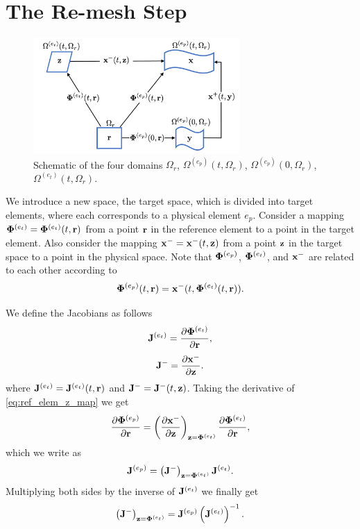 \documentclass[11pt]{report}
\begin{document}
\chapter{The Re-mesh Step}
\begin{figure}[ht]
    \centering
    \includegraphics[width=0.7\textwidth]{../../images/four_spaces.pdf}
    \caption{Schematic of the four domains $\Omega_r$, $\Omega^{(e_p)}(t,\Omega_r)$, $\Omega^{(e_p)}(0,\Omega_r)$, $\Omega^{(e_t)}(t,\Omega_r)$.}
    \label{fig:four_spaces}
 \end{figure}
We introduce a new space, the target space, which is divided into target elements, where each corresponds to a physical element $e_p$. Consider a mapping $\bm \Phi^{(e_t)}=\bm \Phi^{(e_t)}(t,\mathbf{r})$ from a point $\mathbf{r}$ in the reference element to a point in the target element. Also consider the mapping $\mathbf{x}^- = \mathbf{x}^-(t,\mathbf{z})$ from a point $\mathbf{z}$ in the target space to a point in the physical space. Note that $\bm \Phi^{(e_p)}$, $\bm \Phi^{(e_t)}$, and $\mathbf{x}^-$ are related to each other according to
\begin{equation}
    \label{eq:ref_elem_z_map}
    \bm \Phi^{(e_p)}(t,\mathbf{r}) = \mathbf{x}^-(t,\bm \Phi^{(e_t)}(t,\mathbf{r})).
\end{equation}

We define the Jacobians as follows
\begin{equation}
    \mathbf{J}^{(e_t)} = \frac{\partial \bm \Phi^{(e_t)}}{\partial \mathbf{r}},
\end{equation}
\begin{equation}
    \mathbf{J}^- = \frac{\partial \mathbf{x}^-}{\partial \mathbf{z}}.
\end{equation}
where $\mathbf{J}^{(e_t)} = \mathbf{J}^{(e_t)}(t,\mathbf{r})$ and $\mathbf{J}^-=\mathbf{J}^-(t,\mathbf{z})$. Taking the derivative of \cref{eq:ref_elem_z_map} we get
\begin{equation*}
    \frac{\partial \bm \Phi^{(e_p)}}{\partial \mathbf{r}} = \left( \frac{ \partial \mathbf{x}^-}{\partial \mathbf{z}} \right)_{\mathbf{z}=\bm \Phi^{(e_t)}} \frac{ \partial \bm \Phi^{(e_t)} }{ \partial \mathbf{r}},
\end{equation*}
which we write as
\begin{equation*}
    \mathbf{J}^{(e_p)} = \left( \mathbf{J}^- \right)_{\mathbf{z}=\bm \Phi^{(e_t)}} \mathbf{J}^{(e_t)}.
\end{equation*}
Multiplying both sides by the inverse of $\mathbf{J}^{(e_t)}$ we finally get
\begin{equation}
    \left( \mathbf{J}^- \right)_{\mathbf{z}=\bm \Phi^{(e_t)}} = \mathbf{J}^{(e_p)} \left( \mathbf{J}^{(e_t)} \right)^{-1}.
\end{equation}
\end{document}
